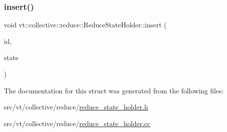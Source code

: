 \mbox{\label{structvt_1_1collective_1_1reduce_1_1_reduce_state_holder_ad4920cf3f7763a06de206ad0735500da}} 
\subsubsection{\texorpdfstring{insert()}{insert()}}
{\footnotesize\ttfamily void vt\+::collective\+::reduce\+::\+Reduce\+State\+Holder\+::insert (\begin{DoxyParamCaption}\item[{\hyperlink{structvt_1_1collective_1_1reduce_1_1_reduce_state_holder_ac75b7127c84d699f42c0bc3f3b02bb0b}{Reduce\+I\+D\+Type} const \&}]{id,  }\item[{\hyperlink{structvt_1_1collective_1_1reduce_1_1_reduce_state_holder_a4a87ec20428609cb6c8ec49c11893389}{Reduce\+State\+Type} \&\&}]{state }\end{DoxyParamCaption})}



The documentation for this struct was generated from the following files\+:\begin{DoxyCompactItemize}
\item 
src/vt/collective/reduce/\hyperlink{reduce__state__holder_8h}{reduce\+\_\+state\+\_\+holder.\+h}\item 
src/vt/collective/reduce/\hyperlink{reduce__state__holder_8cc}{reduce\+\_\+state\+\_\+holder.\+cc}\end{DoxyCompactItemize}
